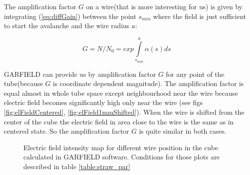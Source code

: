 \documentclass[]{article}
\begin{document}
	The amplification factor $G$ on a wire(that is more interesting for us) is given by integrating (\ref{eq:diffGain}) between the point $s_{min}$ where the field is just sufficient to start the avalanche and the wire radius $a$:
	
	\begin{equation}
	G = N/N_0 = exp \int\limits_{s_{min}}^{a} \alpha(s) ds
	\label{eq:gain}
	\end{equation}
	
	GARFIELD can provide us by amplification factor $G$ for any point of the tube(because  $G$ is coordinate dependent magnitude). The amplification factor is equal almost in whole tube space except neighbourhood near the wire because electric field  becomes significantly high only near the wire (see figs \ref{fig:elFieldCentered}, \ref{fig:elField1mmShifted}). When the wire is shifted from the center of the cube the electric field in area close to the wire is the same as in centered state. So the amplification factor $G$ is quite similar in both cases.
	
	\begin{figure}[h!] 
		\centering
		\qquad
		\caption{Electric field intensity map for different wire position in the cube calculated in GARFIELD software. Conditions for those plots are described in table \ref{table:straw_par} }
	\end{figure}
	
\end{document}
